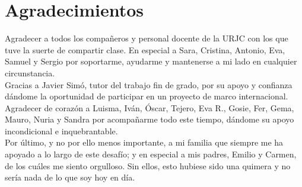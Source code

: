 \chapter*{Agradecimientos}
\thispagestyle{empty}
\label{cap:agradecimientos}
Agradecer a todos los compañeros y personal docente de la URJC con los que tuve la suerte de compartir clase. En especial a Sara, Cristina, Antonio, Eva, Samuel y Sergio por soportarme, ayudarme y mantenerse a mi lado en cualquier circunstancia.\\

Gracias a Javier Simó, tutor del trabajo fin de grado, por su apoyo y confianza dándome la oportunidad de participar en un proyecto de marco internacional.\\ 


Agradecer de corazón a Luisma, Iván, Óscar, Tejero, Eva R., Gosie, Fer, Gema, Mauro, Nuria y Sandra por acompañarme todo este tiempo, dándome su apoyo incondicional e inquebrantable.\\

Por último, y no por ello menos importante, a mi familia que siempre me ha apoyado a lo largo de este desafío; y en especial a mis padres, Emilio y Carmen, de los cuáles me siento orgulloso. Sin ellos, esto hubiese sido una quimera y no sería nada de lo que soy hoy en día.

\afterpage{\null\newpage}
\pagestyle{empty}